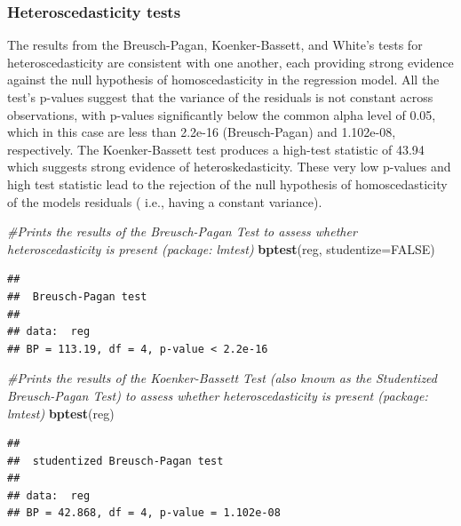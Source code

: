 \documentclass[
]{article}
\newenvironment{Shaded}{\begin{snugshade}}{\end{snugshade}}
\newcommand{\AttributeTok}[1]{\textcolor[rgb]{0.13,0.29,0.53}{#1}}
\newcommand{\CommentTok}[1]{\textcolor[rgb]{0.56,0.35,0.01}{\textit{#1}}}
\newcommand{\ConstantTok}[1]{\textcolor[rgb]{0.56,0.35,0.01}{#1}}
\newcommand{\FunctionTok}[1]{\textcolor[rgb]{0.13,0.29,0.53}{\textbf{#1}}}
\newcommand{\NormalTok}[1]{#1}
\begin{document}
\hypertarget{heteroscedasticity-tests}{%
\subsubsection{Heteroscedasticity
tests}\label{heteroscedasticity-tests}}

The results from the Breusch-Pagan, Koenker-Bassett, and White's tests
for heteroscedasticity are consistent with one another, each providing
strong evidence against the null hypothesis of homoscedasticity in the
regression model. All the test's p-values suggest that the variance of
the residuals is not constant across observations, with p-values
significantly below the common alpha level of 0.05, which in this case
are less than 2.2e-16 (Breusch-Pagan) and 1.102e-08, respectively. The
Koenker-Bassett test produces a high-test statistic of 43.94 which
suggests strong evidence of heteroskedasticity. These very low p-values
and high test statistic lead to the rejection of the null hypothesis of
homoscedasticity of the models residuals ( i.e., having a constant
variance).

\begin{Shaded}
\begin{Highlighting}[]
\CommentTok{\#Prints the results of the Breusch{-}Pagan Test to assess whether heteroscedasticity is present (package: lmtest)}
\FunctionTok{bptest}\NormalTok{(reg, }\AttributeTok{studentize=}\ConstantTok{FALSE}\NormalTok{)}
\end{Highlighting}
\end{Shaded}

\begin{verbatim}
## 
##  Breusch-Pagan test
## 
## data:  reg
## BP = 113.19, df = 4, p-value < 2.2e-16
\end{verbatim}

\begin{Shaded}
\begin{Highlighting}[]
\CommentTok{\#Prints the results of the Koenker{-}Bassett Test (also known as the Studentized Breusch{-}Pagan Test) to assess whether heteroscedasticity is present (package: lmtest)}
\FunctionTok{bptest}\NormalTok{(reg)      }
\end{Highlighting}
\end{Shaded}

\begin{verbatim}
## 
##  studentized Breusch-Pagan test
## 
## data:  reg
## BP = 42.868, df = 4, p-value = 1.102e-08
\end{verbatim}
\end{document}
